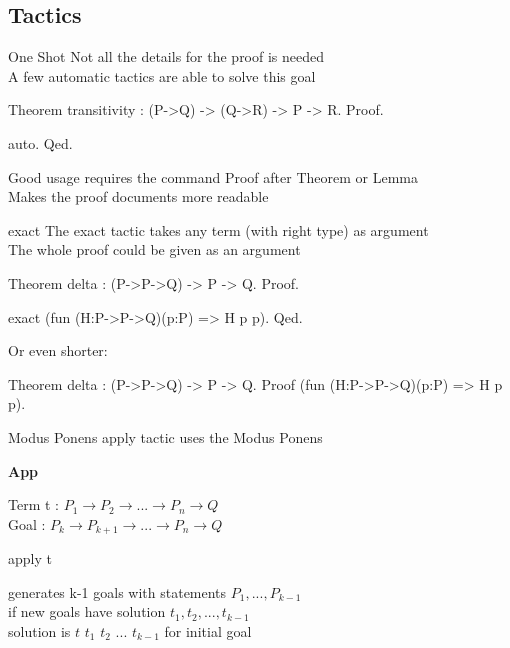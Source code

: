 \subsection{Tactics}
\begin{frame}[fragile]{One Shot}
	Not all the details for the proof is needed\\
	\medskip
	\pause
	A few automatic tactics are able to solve this goal
	\pause
	\begin{user}
	Theorem transitivity : (P->Q) -> (Q->R) -> P -> R.
	Proof.
	\end{user}
	\pause
	\begin{user}
		auto.
	Qed.
	\end{user}
	\pause
	Good usage requires the command Proof after Theorem or Lemma\\
	\smallskip
	Makes the proof documents more readable
\end{frame}
\begin{frame}[fragile]{exact}
	The exact tactic takes any term (with right type) as argument\\
	\pause
	\smallskip
	The whole proof could be given as an argument\\
	\pause
	\medskip
	\begin{user}
	Theorem delta : (P->P->Q) -> P -> Q.
	Proof.
	\end{user}
	\pause
	\begin{user}
	exact (fun (H:P->P->Q)(p:P) => H p p).
	Qed.
	\end{user}
	\pause
	\medskip
	Or even shorter:
	\begin{user}
	Theorem delta : (P->P->Q) -> P -> Q.
	Proof (fun (H:P->P->Q)(p:P) => H p p).
	\end{user}
\end{frame}
\begin{frame}[fragile]{Modus Ponens}
	apply tactic uses the Modus Ponens\\
	\pause
	\medskip
	\begin{prooftree}
	\textbf{App}
	\end{prooftree}
	\pause
	Term t : $P_1 \rightarrow P_2 \rightarrow ... \rightarrow P_n \rightarrow Q$ \\
	Goal : $P_k \rightarrow P_{k+1} \rightarrow ... \rightarrow P_n \rightarrow Q$
	\pause
	\medskip
	\begin{user}
	apply t
	\end{user}
	generates k-1 goals with statements $P_1, ..., P_{k-1}$\\
	\pause
	\smallskip
	if new goals have solution $t_1, t_2, ..., t_{k-1}$\\
	solution is $t$ $t_1$ $t_2$ ... $t_{k-1}$ for initial goal
\end{frame}
